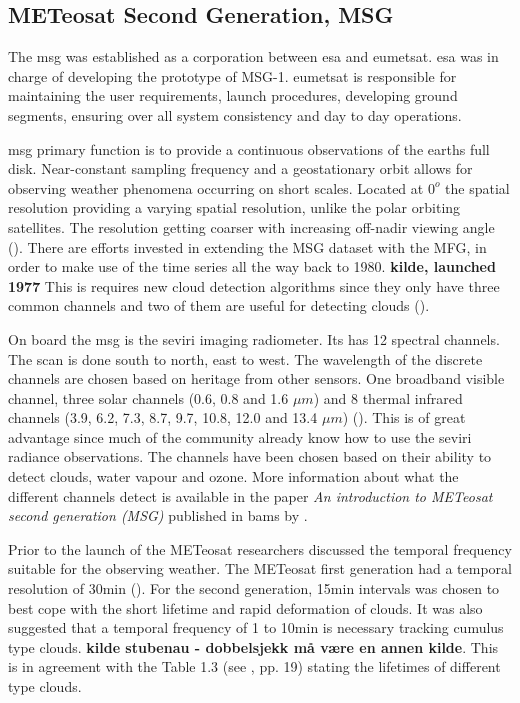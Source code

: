 \subsection{METeosat Second Generation, MSG} \label{sec:meteosat}
The \acrfull{msg} was established as a corporation between \acrfull{esa} and \acrfull{eumetsat}. \acrshort{esa} was in charge of developing the prototype of MSG-1. \acrshort{eumetsat} is responsible for maintaining the user requirements, launch procedures, developing ground segments, ensuring over all system consistency and day to day operations. 

\acrshort{msg} primary function is to provide a continuous observations of the earths full disk. Near-constant sampling frequency and a geostationary orbit allows for observing weather phenomena occurring on short scales. Located at $0^o$ the spatial resolution providing a varying spatial resolution, unlike the polar orbiting satellites. The resolution getting coarser with increasing off-nadir viewing angle (\cite{Stubenrauch2013AssessmentPanel}). There are efforts invested in extending the MSG dataset with the MFG, in order to make use of the time series all the way back to 1980. \textbf{kilde, launched 1977} This is requires new cloud detection algorithms since they only have three common channels and two of them are useful for detecting clouds (\cite{Stockli2019CloudApplications}). 

On board the \acrshort{msg} is the \acrfull{seviri} imaging radiometer. Its has  12 spectral channels. The scan is done south to north, east to west. The wavelength of the discrete channels are chosen based on heritage from other sensors. One broadband visible channel, three solar channels (0.6, 0.8 and 1.6 $\mu m$) and 8 thermal infrared channels (3.9, 6.2, 7.3, 8.7, 9.7, 10.8, 12.0 and 13.4 $\mu m$) (\cite{Taravat2015MultilayerMasking}). This is of great advantage since much of the community already know how to use the \acrshort{seviri} radiance observations. The channels have been chosen based on their ability to detect clouds, water vapour and ozone. More information about what the different channels detect is available in the paper \textit{An introduction to METeosat second generation (MSG)} published in \acrshort{bams} by .

Prior to the launch of the METeosat researchers discussed the temporal frequency suitable for the observing weather. The METeosat first generation had a temporal resolution of 30min (\cite{Stockli2019CloudApplications}). For the second generation, 15min intervals was chosen to best cope with the short lifetime and rapid deformation of clouds. It was also suggested that a temporal frequency of 1 to 10min is necessary tracking cumulus type clouds. \textbf{kilde stubenau - dobbelsjekk må være en annen kilde}. This is in agreement with the Table 1.3 (see \cite{lohmann2016}, pp. 19) stating the lifetimes of different type clouds.

